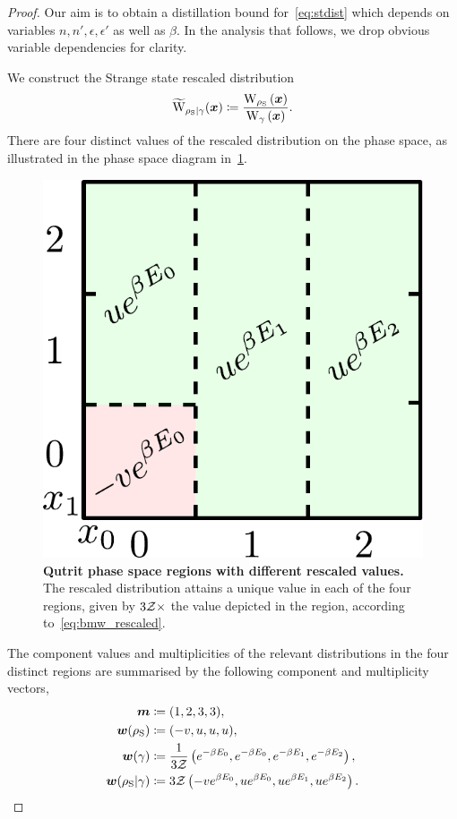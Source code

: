 \documentclass[pra,
aps,
twocolumn,
superscriptaddress,
groupedaddress,
nofootinbib,
reprint
]{revtex4-1}
\begin{document}
\begin{proof}
Our aim is to obtain a distillation bound for~\cref{eq:stdist} which depends on variables $n, n', \epsilon, \epsilon'$ as well as $\beta$.
In the analysis that follows, we drop obvious variable dependencies for clarity.

We construct the Strange state rescaled distribution 
\begin{equation}
	\widetilde{\rm{W}}_{\rho_{\rm{S}}|\gamma}(\bmx) \coloneqq \frac{\W[\bmx]{\rho_{\rm{S}}}}{\W[\bmx]{\gamma}}.
\end{equation}
There are four distinct values of the rescaled distribution on the phase space, as illustrated in the phase space diagram in~\cref{fig:pd_split_thermal}.
\begin{figure}[h]
    \centering
    \includegraphics[scale=0.5]{figs/pd_split_thermal.pdf}
    \caption{\textbf{Qutrit phase space regions with different rescaled values.}
    The rescaled distribution attains a unique value in each of the four regions, given by $3\mathcal{Z} \times$ the value depicted in the region, according to~\cref{eq:bmw_rescaled}.
    }
    \label{fig:pd_split_thermal}
\end{figure}

The component values and multiplicities of the relevant distributions in the four distinct regions are summarised by the following component and multiplicity vectors,
\begin{align}
	\bm{m} &\coloneqq (1,2,3,3), \\
	\bm{w}(\rho_{\rm{S}}) &\coloneqq (-v, u, u, u), \\
	\bm{w}(\gamma) &\coloneqq \frac{1}{3\mathcal{Z}} \left( e^{-\beta E_0}, e^{-\beta E_0}, e^{-\beta E_1}, e^{-\beta E_2} \right), \\
	\bm{w}(\rho_{\rm{S}} | \gamma) &\coloneqq 3\mathcal{Z} \left( -v e^{\beta E_0}, u e^{\beta E_0}, u e^{\beta E_1}, u e^{\beta E_2} \right). \label{eq:bmw_rescaled}
\end{align}


\end{proof}
\end{document}
